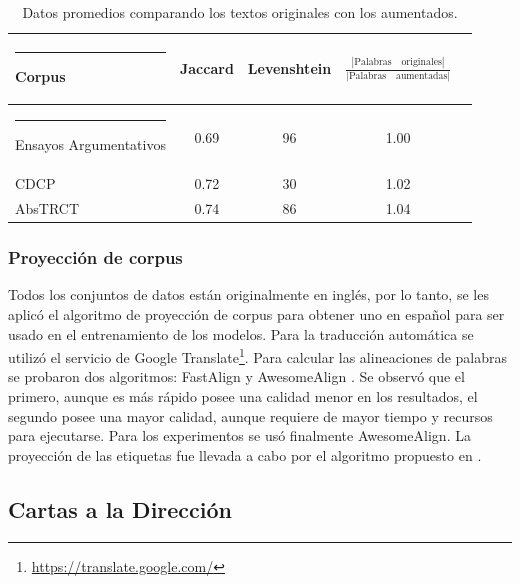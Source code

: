 \documentclass[a4paper,11pt,twocolumn,twoside]{article}
\begin{document}
\begin{table}[h]
	\begin{center}
		\begin{tabular}{|l|c|c|c|c|} 
			\hline\rule{-2pt}{15pt}
			{\bf Corpus}                 & {\bf Jaccard} & {\bf Levenshtein} & {\bf $\frac{|\mathrm{Palabras} \quad \mathrm{originales}|}{|\mathrm{Palabras \quad aumentadas}|}$} \\ 
			\hline\rule{-4pt}{10pt}
			Ensayos Argumentativos & 0.69    & 96          & 1.00	\\
			CDCP                   & 0.72    & 30          & 1.02	\\
			AbsTRCT                & 0.74    & 86          & 1.04	\\ 
			\hline
		\end{tabular}
	\end{center}
	\caption{Datos promedios comparando los textos originales con los aumentados.}\label{table:data_augmentation}
\end{table}

\subsubsection{Proyección de corpus}

Todos los conjuntos de datos están originalmente en inglés, por lo tanto, se les aplicó el algoritmo de proyección
de corpus para obtener uno en español para ser usado en el entrenamiento de los modelos. 
Para la traducción automática se utilizó el servicio de Google Translate\footnote{\url{https://translate.google.com/}}. 
Para calcular las 
alineaciones de palabras se probaron dos algoritmos: FastAlign \cite{dyer2013fastalign} y AwesomeAlign 
\cite{dou2021word}. Se observó que el primero, aunque es más rápido posee una calidad menor en los resultados,
el segundo posee una mayor calidad, aunque requiere de mayor tiempo y recursos para ejecutarse. Para los experimentos
se usó finalmente AwesomeAlign. La proyección de las etiquetas fue llevada a cabo por el algoritmo propuesto 
en \cite{eger2018cross}.

\subsection{Cartas a la Dirección}
\end{document}
